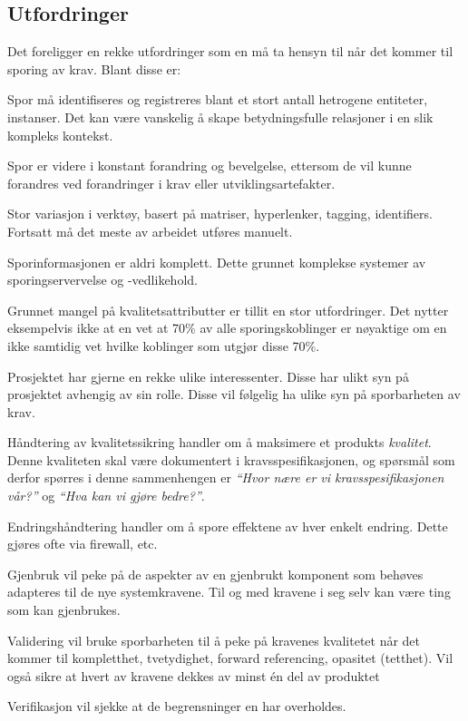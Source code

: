 \subsection{Utfordringer}

Det foreligger en rekke utfordringer som en må ta hensyn til når det
kommer til sporing av krav. Blant disse er:

Spor må identifiseres og registreres blant et stort antall hetrogene
entiteter, instanser. Det kan være vanskelig å skape betydningsfulle
relasjoner i en slik kompleks kontekst.

Spor er videre i konstant forandring og bevelgelse, ettersom de vil
kunne forandres ved forandringer i krav eller utviklingsartefakter.

Stor variasjon i verktøy, basert på matriser, hyperlenker, tagging,
identifiers. Fortsatt må det meste av arbeidet utføres manuelt.

Sporinformasjonen er aldri komplett. Dette grunnet komplekse systemer av
sporingservervelse og -vedlikehold.

Grunnet mangel på kvalitetsattributter er tillit en stor utfordringer.
Det nytter eksempelvis ikke at en vet at 70\% av alle sporingskoblinger
er nøyaktige om en ikke samtidig vet hvilke koblinger som utgjør disse
70\%.

Prosjektet har gjerne en rekke ulike interessenter. Disse har ulikt syn
på prosjektet avhengig av sin rolle. Disse vil følgelig ha ulike syn på
sporbarheten av krav.

Håndtering av kvalitetssikring handler om å maksimere et produkts
\emph{kvalitet}. Denne kvaliteten skal være dokumentert i
kravsspesifikasjonen, og spørsmål som derfor spørres i denne
sammenhengen er \emph{``Hvor nære er vi kravsspesifikasjonen vår?''} og
\emph{``Hva kan vi gjøre bedre?''}.

Endringshåndtering handler om å spore effektene av hver enkelt endring.
Dette gjøres ofte via firewall, etc.

Gjenbruk vil peke på de aspekter av en gjenbrukt komponent som behøves
adapteres til de nye systemkravene. Til og med kravene i seg selv kan
være ting som kan gjenbrukes.

Validering vil bruke sporbarheten til å peke på kravenes kvalitetet når
det kommer til kompletthet, tvetydighet, forward referencing, opasitet
(tetthet). Vil også sikre at hvert av kravene dekkes av minst én del av
produktet

Verifikasjon vil sjekke at de begrensninger en har overholdes.

